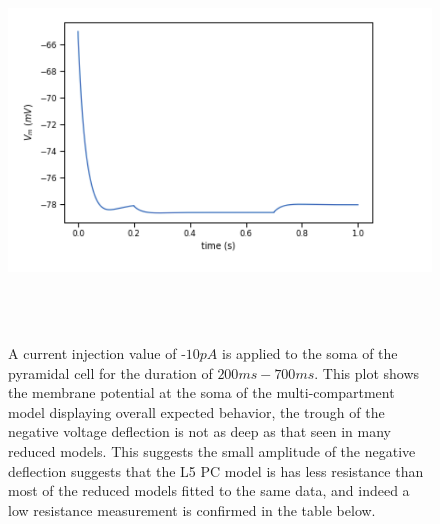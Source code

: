 \begin{figure}
\begin{center}
    \includegraphics[scale=0.8]{figures/correct_passive_l5pc.png}
    \caption[passive virtual experiment in the Layer 5 Pyramidal Cell]{A current injection value of -$10pA$ is applied to the soma of the pyramidal cell for the duration of $200ms-700ms$. This plot shows the membrane potential at the soma of the multi-compartment model displaying overall expected behavior, the trough of the negative voltage deflection is not as deep as that seen in many reduced models. This suggests the small amplitude of the negative deflection suggests that the L5 PC model is has less resistance than most of the reduced models fitted to the same data, and indeed a low resistance measurement is confirmed in the table below.}
  \label{fig:sub2}
\end{center}
\end{figure}


